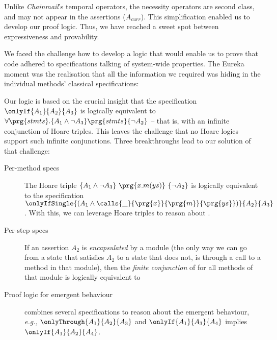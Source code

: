   
  \vspace{.02in}
  
Unlike  \emph{Chainmail}'s temporal operators, 
 the necessity operators %
 are second class, and may not appear in the assertions  {(\eg  ${A_{curr}}$)}. 
 This simplification enabled us to develop our proof logic. 
 Thus, we {have reached} a  sweet spot between expressiveness and 
 provability.
 
We faced the challenge  how to develop a logic that would enable us to prove that code 
 adhered to  specifications {talking of system-wide properties.} 
 The Eureka moment was the realisation that all the information we required was hiding  { in the individual methods' classical specifications:}

 {Our logic  
 is based on the crucial insight that the specification $\onlyIf{A_1} {A_2} {A_3}$ is 
logically equivalent
{to}
 $\forall \prg{stmts}. \{ A_1 \wedge \neg A_3\} \prg{stmts} \{ \neg A_2 \}$ -- that is,
 with an infinite conjunction  of Hoare triples.}
 {This leaves the challenge that no Hoare logics support such infinite conjunctions.
 Three breakthroughs lead to our solution of that challenge:}
 \begin{description}
 \item
 [Per-method specs] 
  The Hoare triple 
$ \{ A_1 \wedge \neg A_3 \} \ \prg{x.m(ys)}\  \{ \neg A_2 \}$ is logically equivalent 
 {to} the specification
$ \onlyIfSingle {(A_1 \wedge  \calls{\_}{\prg{x}}{\prg{m}}{\prg{ys}} )} {A_2} {A_3}$.  
With this, we can leverage Hoare triples to reason about .  
 
 \item 
 [Per-step specs] %
 If an assertion $A_2$  is \emph{encapsulated} by a module (\ie the only way we can go from a 
 state that satisfies $A_2$ to a state that does not, is through a call to a method in that module), then
{the
\emph{finite conjunction}
of 
 for all methods of that module is logically equivalent 
 {to}
 }
  \item [Proof logic  for emergent behaviour] %
  combines several specifications to reason about the
  emergent behaviour, \emph{e.g.,} 
   $ \onlyThrough  {A_1} {A_2} {A_3}$  and $ \onlyIf  {A_1} {A_3} {A_4}$ implies 
   $ \onlyIf  {A_1} {A_2} {A_4}$.
 \end{description}
  

